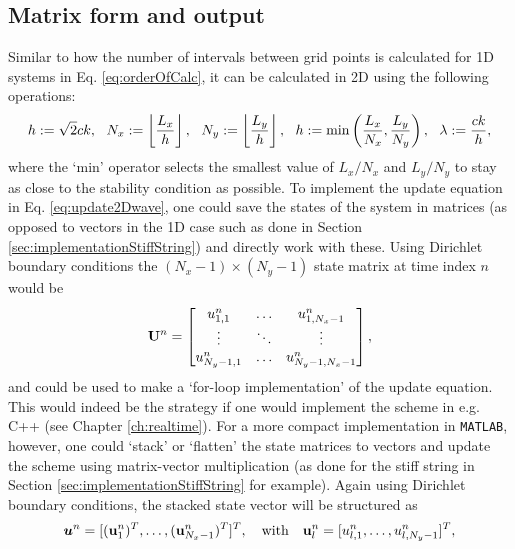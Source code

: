 \subsection{Matrix form and output}\label{sec:2DwaveImplementation}
Similar to how the number of intervals between grid points is calculated for 1D systems in Eq. \eqref{eq:orderOfCalc}, it can be calculated in 2D using the following operations:
\begin{equation}\label{eq:orderOfCalc2D}
    h := \sqrt{2} ck, \ \ N_x := \floor[\frac{L_x}{h}], \ \  N_y := \floor[\frac{L_y}{h}], \ \  h := \text{min}\left(\frac{L_x}{N_x}, \frac{L_y}{N_y}\right), \ \  \lambda := \frac{ck}{h},
\end{equation}
where the `$\text{min}$' operator selects the smallest value of $L_x/N_x$ and $L_y/N_y$ to stay as close to the stability condition as possible. 
To implement the update equation in Eq. \eqref{eq:update2Dwave}, one could save the states of the system in matrices (as opposed to vectors in the 1D case such as done in Section \ref{sec:implementationStiffString}) and directly work with these. Using Dirichlet boundary conditions the $(N_x-1) \times (N_y-1)$ state matrix at time index $n$ would be
\begin{equation}
    \mathbf{U}^n = \begin{bmatrix}
        u^n_{1, 1} & \hdots & u^n_{1, N_x-1}\\
        \vdots & \ddots & \vdots\\
        u^n_{N_y-1, 1} & \hdots & u^n_{N_y-1, N_x-1}
    \end{bmatrix},
\end{equation}
and could be used to make a `for-loop implementation' of the update equation. This would indeed be the strategy if one would implement the scheme in e.g. C++ (see Chapter \ref{ch:realtime}). For a more compact implementation in \texttt{MATLAB}, however, one could `stack' or `flatten' the state matrices to vectors and update the scheme using matrix-vector multiplication (as done for the stiff string in Section \ref{sec:implementationStiffString} for example). Again using Dirichlet boundary conditions, the stacked state vector will be structured as
\begin{equation}\label{eq:stackedState}
    \boldsymbol{u}^n = [(\mathbf{u}_{1}^n)^T, \hdots, (\mathbf{u}_{N_x-1}^n)^T]^T, \quad \text{with} \quad \mathbf{u}^n_l = [u^n_{l, 1}, \hdots, u^n_{l, N_y-1}]^T,
\end{equation}
